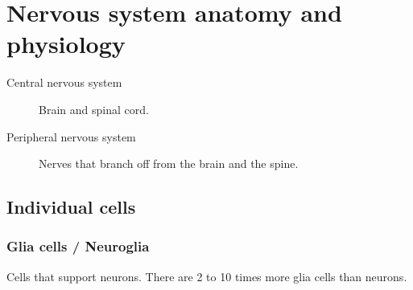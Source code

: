 \chapter{Nervous system anatomy and physiology}


\begin{description}
    \item[Central nervous system] Brain and spinal cord.
    \item[Peripheral nervous system] Nerves that branch off from the brain and the spine.
\end{description}

\section{Individual cells}



\subsection{Glia cells / Neuroglia}
Cells that support neurons.
There are 2 to 10 times more glia cells than neurons.\\

